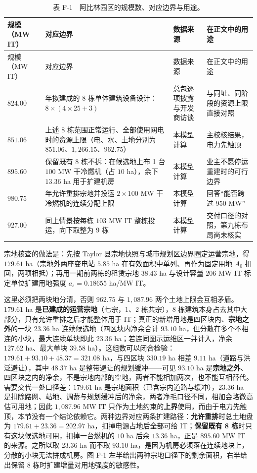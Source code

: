 {\footnotesize
\begin{longtable}{@{}>{\raggedright\arraybackslash}p{}>{\raggedright\arraybackslash}p{}>{\raggedright\arraybackslash}p{}>{\raggedright\arraybackslash}p{}@{}}
\caption{表 F-1　阿比林园区的规模数、对应边界与用途。}\label{tab:F-1}\\
\toprule
规模（MW IT） & 对应边界 & 数据来源 & 在正文中的用途 \\
\midrule
\endfirsthead
\toprule
规模（MW IT） & 对应边界 & 数据来源 & 在正文中的用途 \\
\midrule
\endhead
\bottomrule
\endlastfoot
$824.00$ & 2026 年拟建成的 8 栋单体建筑设备设计：$8\times(4\times25+3)$ & 总包逐项披露与开发商访谈 & 与同址、同阶段的资源上限直接对照 \\
$851.06$ & 上述 8 栋范围正常运行、全部使用网电时的资源上限（电、水、土地分别为 $851.06$、$1{,}266.15$、$962.75$） & 本模型计算 & 主校核结果，电力先触顶 \\
$895.60$ & 保留既有 8 栋不拆：在候选地上布 1 台 $100$ MW 干冷燃机（占 $10$ ha），余下 $13.36$ ha 用于扩建机房 & 本模型计算 & 业主不愿停运重建时的可行边界 \\
$980.75$ & 2033 年允许重排宗地并投运 $2\times100$ MW 干冷燃机的连续分配上限 & 本模型计算 & 回答“能否跨过 950 MW” \\
$927.00$ & 同上情景按每栋 $103$ MW IT 整栋投运，向下取整为 9 栋 & 本模型计算 & 交付口径的对照，第九栋布局尚未核实 \\
\end{longtable}
}

宗地核查的做法是：先按 Taylor 县宗地快照与城市规划区边界圈定运营宗地，得 $179.61$ ha（宗地外两座变电站 $5.85$ ha 在有效面积中单列、再作为固定用地 $A_0$ 扣回，两项相抵）；再用一期前两栋的租赁宗地 $38.43$ ha 与设计容量 $206$ MW IT 标定单位扩建用地强度 $a_s=0.18655$ ha/MW IT。

这里必须把两块地分清，否则 $962.75$ 与 $1{,}087.96$ 两个土地上限会互相矛盾。$179.61$ ha 是\textbf{已建成的运营宗地}（七宗，1、2 栋共宗），8 栋建筑本身占去其中大部分，只有允许重排之后才能整体用于 IT；真正的新增用地是四区块内、\textbf{宗地之外}的一块 $23.36$ ha 连续候选地（四区块内净余合计 $93.10$ ha，但分散在多个不相连的小块，最大连续单块即此 $23.36$ ha；若连同图示运维区一并计入，净余 $127.62$ ha、最大单块 $39.58$ ha）。这组数可以闭合检验：$179.61+93.10+48.37=321.08$ ha，与四区块 $330.19$ ha 相差 $9.11$ ha（道路与洪泛避让），其中 $48.37$ ha 是整带避让的规划缓冲——可见 $93.10$ ha 是\textbf{宗地之外}、四区块之内的净余，不是宗地内部的空地，两者不能相加两次，也不能互相替代。需要交代一处口径差：$179.61$ ha 是宗地面积（已含宗内道路与缓冲），$23.36$ ha 是扣除路网、站地、调蓄与规划缓冲后的净余，两者净毛口径不同，相加会略微高估可用地；因此 $1{,}087.96$ MW IT 只作为土地约束的\textbf{上界}使用，而由于电力先触顶，本节没有一个结论依赖它。两种边界对应两条扩建路径：\textbf{允许重排}时总土地盘为 $179.61+23.36=202.97$ ha，扣掉电源占地后全部可给 IT；\textbf{保留既有 8 栋}时只有这块候选地可用，扣掉一台燃机的 $10$ ha 后余 $13.36$ ha，正是 $895.60$ MW IT 的来源。之所以取 $23.36$ ha 而不取 $93.10$ ha，是因为机房必须落在连续地块上，分散的小块无法拼成机房。图 F-1 左半给出两种宗地口径下的剩余面积，右半给出保留 8 栋时扩建增量对用地强度的敏感性。

